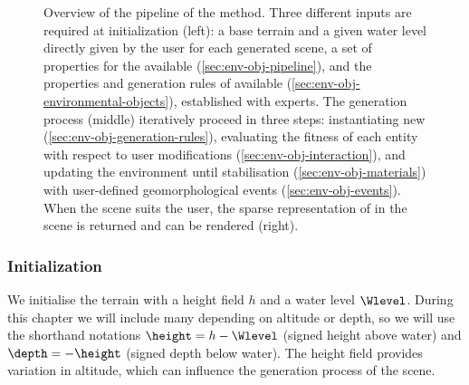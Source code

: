 \begin{figure}[H]
\caption{Overview of the pipeline of the method. Three different inputs are required at initialization (left): a base terrain and a given water level directly given by the user for each generated scene, a set of properties for the  available (\cref{sec:env-obj-pipeline}), and the properties and generation rules of  available (\cref{sec:env-obj-environmental-objects}), established with experts. The generation process (middle) iteratively proceed in three steps: instantiating new  (\cref{sec:env-obj-generation-rules}), evaluating the fitness of each entity with respect to user modifications (\cref{sec:env-obj-interaction}), and updating the environment until stabilisation (\cref{sec:env-obj-materials}) with user-defined geomorphological events (\cref{sec:env-obj-events}). When the scene suits the user, the sparse representation of  in the scene is returned and can be rendered (right). }
\label{fig:env-obj-pipeline}
\end{figure}

\subsubsection{Initialization}

We initialise the terrain with a height field $h$ and a water level $\Wlevel$. During this chapter we will include many  depending on altitude or depth, so we will use the shorthand notations $\height = h-\Wlevel$ (signed height above water) and $\depth=-\height$ (signed depth below water). The height field provides variation in altitude, which can influence the generation process of the scene.

